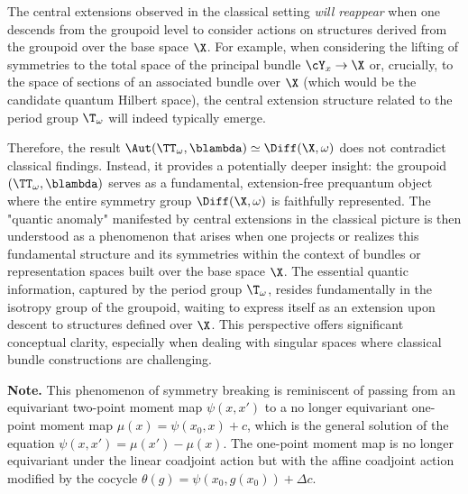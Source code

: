 \begin{article}
    The central extensions observed in the classical setting \emph{will reappear} when one descends from the groupoid level to consider actions on structures derived from the groupoid over the base space $\X$.
    For example,
    when considering the lifting of symmetries to the total space of the principal bundle $\cY_x \to \X$ or,
    crucially,
    to the space of sections of an associated bundle over $\X$ (which would be the candidate quantum Hilbert space),
    the central extension structure related to the period group $\T_\omega$ will indeed typically emerge.
    
    Therefore,
    the result $\Aut(\TT_\omega, \blambda) \simeq \Diff(\X, \omega)$ does not contradict classical findings.
    Instead,
    it provides a potentially deeper insight: the groupoid $(\TT_\omega, \blambda)$ serves as a fundamental,
    extension-free prequantum object where the entire symmetry group $\Diff(\X, \omega)$ is faithfully represented.
    The "quantic anomaly" manifested by central extensions in the classical picture is then understood as a phenomenon that arises when one projects or realizes this fundamental structure and its symmetries within the context of bundles or representation spaces built over the base space $\X$.
    The essential quantic information,
    captured by the period group $\T_\omega$, resides fundamentally in the isotropy group of the groupoid,
    waiting to express itself as an extension upon descent to structures defined over $\X$. This perspective offers significant conceptual clarity,
    especially when dealing with singular spaces where classical bundle constructions are challenging.
    
    \smallskip
    \textbf{Note.} This phenomenon of symmetry breaking is reminiscent of passing from an equivariant two-point moment map $\psi(x,x')$ to a no longer equivariant one-point moment map $\mu(x) = \psi(x_0,x) + c$,
    which is the general solution of the equation $\psi(x,x') = \mu(x') - \mu(x)$.
    The one-point moment map is no longer equivariant under the linear coadjoint action but with the affine coadjoint action modified by the cocycle $\theta(g) = \psi(x_0,g(x_0)) + \Delta c$.
  \end{article}
  
  
  
